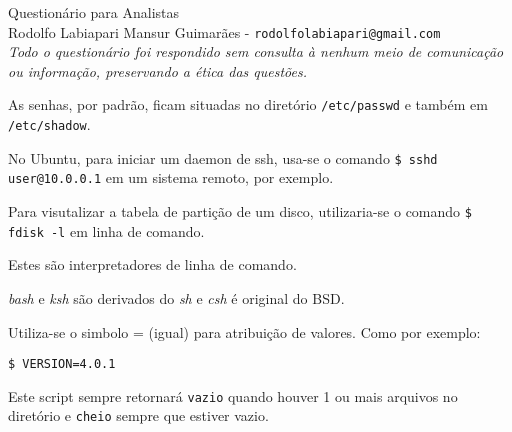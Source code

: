 \documentclass[answers]{exam}
\begin{document}
{\centering
{\Huge Questionário para Analistas}\\
\vspace{1em}
Rodolfo Labiapari Mansur Guimarães - \texttt{rodolfolabiapari@gmail.com}\\
\textit{Todo o questionário foi respondido sem consulta à nenhum meio de comunicação ou informação, preservando a ética das questões.}

\vspace{0.5cm}
}
\begin{questions}

\begin{framed}
As senhas, por padrão, ficam situadas no diretório \texttt{/etc/passwd} e também em \texttt{/etc/shadow}.
\end{framed}



\begin{framed}
No Ubuntu, para iniciar um daemon de ssh, usa-se o comando \texttt{\$ sshd user@10.0.0.1} em um sistema remoto, por exemplo.
\end{framed}



\begin{framed}
Para visutalizar a tabela de partição de um disco, utilizaria-se o comando \texttt{\$ fdisk -l} em linha de comando.
\end{framed}



\begin{framed}
Estes são interpretadores de linha de comando.

\textit{bash} e \textit{ksh} são derivados do \textit{sh} e \textit{csh} é original do BSD.
\end{framed}



\begin{framed}
Utiliza-se o simbolo = (igual) para atribuição de valores. Como por exemplo:

\texttt{\$ VERSION=4.0.1}
\end{framed}



\begin{framed}
Este script sempre retornará \texttt{vazio} quando houver 1 ou mais arquivos no diretório e \texttt{cheio} sempre que estiver vazio.


\end{framed}
\end{questions}
\end{document}

